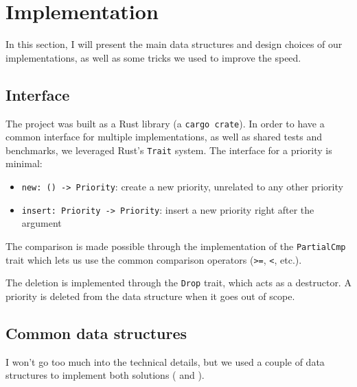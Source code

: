 \documentclass[12pt]{article}
\begin{document}
\newpage
\section{Implementation}

In this section, I will present the main data structures and design choices of our implementations, as well as some tricks we used to improve the speed.

\subsection{Interface}

The project was built as a Rust library (a \lstinline{cargo crate}). In order to have a common interface for multiple implementations, as well as shared tests and benchmarks, we leveraged Rust's \lstinline{Trait} system. The interface for a priority is minimal:
\begin{itemize}
    \item \lstinline{new: () -> Priority}: create a new priority, unrelated to any other priority
    \item \lstinline{insert: Priority -> Priority}: insert a new priority right after the argument
\end{itemize}

The comparison is made possible through the implementation of the \lstinline{PartialCmp} trait which lets us use the common comparison operators (\lstinline{>=}, \lstinline{<}, etc.).

The deletion is implemented through the \lstinline{Drop} trait, which acts as a destructor. A priority is deleted from the data structure when it goes out of scope.

\subsection{Common data structures}

I won't go too much into the technical details, but we used a couple of data structures to implement both solutions (\cite{10.5555/647912.740822} and \cite{10.1145/28395.28434}).
\end{document}
